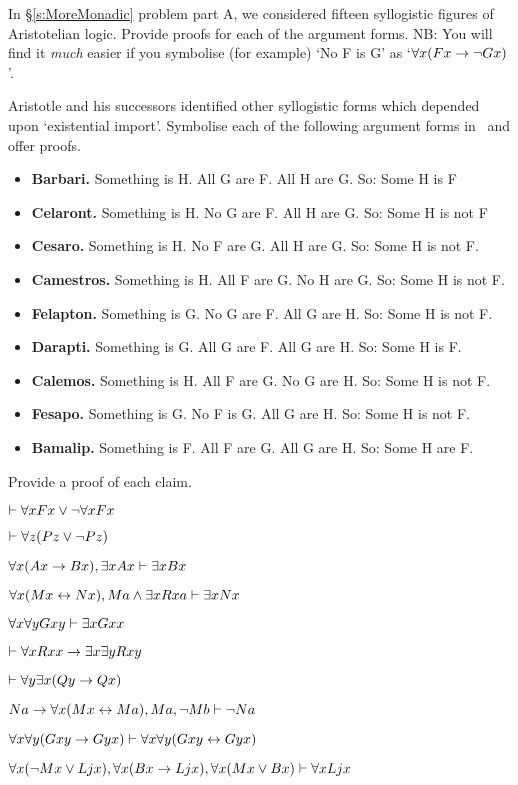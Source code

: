 \problempart
\label{pr.BarbaraEtc.proof1}
In §\ref{s:MoreMonadic} problem part A, we considered fifteen syllogistic figures of Aristotelian logic. Provide proofs for each of the argument forms. NB: You will find it \emph{much} easier if you symbolise (for example) `No F is G' as `$\forall x (Fx \rightarrow \neg Gx)$'.


\problempart
\label{pr.BarbaraEtc.proof2}
Aristotle and his successors identified other syllogistic forms which depended upon `existential import'. Symbolise each of the following argument forms in \FOL\ and offer proofs.
\begin{itemize}
	\item \textbf{Barbari.} Something is H. All G are F. All H are G. So: Some H is F
	\item \textbf{Celaront.} Something is H. No G are F. All H are G. So: Some H is not F
	\item \textbf{Cesaro.} Something is H. No F are G. All H are G. So: Some H is not F.
	\item \textbf{Camestros.} Something is H. All F are G. No H are G. So: Some H is not F.
	\item \textbf{Felapton.} Something is G. No G are F. All G are H. So: Some H is not F.
	\item \textbf{Darapti.} Something is G. All G are F. All G are H. So: Some H is F.
	\item \textbf{Calemos.} Something is H. All F are G. No G are H. So: Some H is not F.
	\item \textbf{Fesapo.} Something is G. No F is G. All G are H. So: Some H is not F.
	\item \textbf{Bamalip.} Something is F. All F are G. All G are H. So: Some H are F.
\end{itemize}

\problempart
\label{pr.someFOLproofs}
Provide a proof of each claim.
\begin{earg}
\item $\vdash \forall x Fx \vee \neg \forall x Fx$
\item $\vdash\forall z (Pz \vee \neg Pz)$
\item $\forall x(Ax\rightarrow Bx), \exists x Ax \vdash \exists x Bx$
\item $\forall x(Mx \leftrightarrow Nx), Ma\wedge\exists x Rxa\vdash \exists x Nx$
\item $\forall x \forall y Gxy\vdash\exists x Gxx$
\item $\vdash\forall x Rxx\rightarrow \exists x \exists y Rxy$
\item $\vdash\forall y \exists x (Qy \rightarrow Qx)$
\item $Na \rightarrow \forall x(Mx \leftrightarrow Ma), Ma, \neg Mb\vdash \neg Na$
\item $\forall x \forall y (Gxy \rightarrow Gyx) \vdash \forall x\forall y (Gxy \leftrightarrow Gyx)$
\item $\forall x(\neg Mx \vee Ljx), \forall x(Bx\rightarrow Ljx), \forall x(Mx\vee Bx)\vdash \forall xLjx$
\end{earg}

